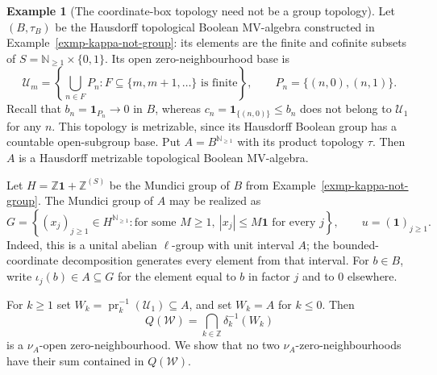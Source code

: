 \documentclass[preprint,3p]{elsarticle}
\theoremstyle{plain}
\theoremstyle{definition}
\newtheorem{exmp}[thm]{Example}
\numberwithin{equation}{section}
\begin{document}
\begin{exmp}[The coordinate-box topology need not be a group topology]
\label{exmp-box-not-group}
Let $(B,\tau_B)$ be the Hausdorff topological Boolean MV-algebra
constructed in Example~\ref{exmp-kappa-not-group}: its elements are
the finite and cofinite subsets of
$S=\mathbb N_{\geq1}\times\{0,1\}$.
Its open zero-neighbourhood base is
\[
 \mathcal U_m=
 \left\{\bigcup_{n\in F}P_n:
 F\subseteq\{m,m+1,\ldots\}\text{ is finite}\right\},
 \qquad P_n=\{(n,0),(n,1)\}.
\]
Recall that $b_n=\mathbf1_{P_n}\to0$ in $B$, whereas
$c_n=\mathbf1_{\{(n,0)\}}\leq b_n$ does not belong to
$\mathcal U_1$ for any $n$.  This topology is metrizable, since
its Hausdorff Boolean group has a countable open-subgroup base.
Put $A=B^{\mathbb N_{\geq1}}$ with its product topology $\tau$.
Then $A$ is a Hausdorff metrizable topological Boolean MV-algebra.

Let $H=\mathbb Z\mathbf1+\mathbb Z^{(S)}$ be the Mundici group
of $B$ from Example~\ref{exmp-kappa-not-group}.  The Mundici group
of $A$ may be realized as
\[
 G=\left\{(x_j)_{j\geq1}\in H^{\mathbb N_{\geq1}}:
       \text{for some }M\geq1,\ 
       |x_j|\leq M\mathbf1\text{ for every }j\right\},
 \qquad u=(\mathbf1)_{j\geq1}.
\]
Indeed, this is a unital abelian $\ell$-group with unit interval
$A$; the bounded-coordinate decomposition generates every element
from that interval.  For $b\in B$, write $\iota_j(b)\in A\subseteq G$
for the element equal to $b$ in factor $j$ and to $0$ elsewhere.

For $k\geq1$ set
$W_k=\operatorname{pr}_k^{-1}(\mathcal U_1)\subseteq A$,
and set $W_k=A$ for $k\leq0$.  Then
\[
 Q(\mathcal W)=\bigcap_{k\in\mathbb Z}\delta_k^{-1}(W_k)
\]
is a $\nu_A$-open zero-neighbourhood.
We show that no two $\nu_A$-zero-neighbourhoods have their
sum contained in $Q(\mathcal W)$.


\end{exmp}
\end{document}
